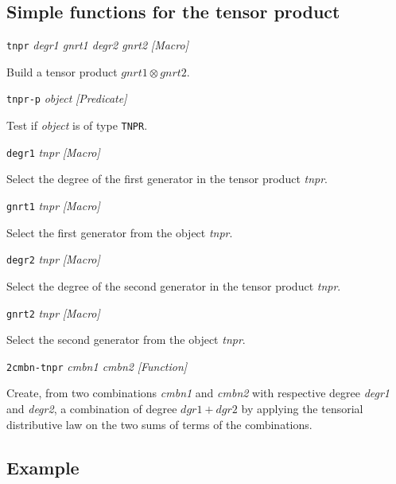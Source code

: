 \subsection {Simple functions for the tensor product}

{\parindent=0mm
{\leftskip=5mm 
{\tt tnpr} {\em degr1 gnrt1 degr2 gnrt2} \hfill {\em [Macro]} \par}
{\leftskip=15mm 
Build a tensor product $gnrt1 \otimes gnrt2$. \par}
{\leftskip=5mm 
{\tt tnpr-p} {\em object} \hfill {\em [Predicate]} \par}
{\leftskip=15mm 
Test if {\em object} is of type {\tt TNPR}. \par}
{\leftskip=5mm 
{\tt degr1} {\em tnpr} \hfill {\em [Macro]} \par}
{\leftskip=15mm 
Select the degree of the first generator in the tensor product {\em tnpr}. \par}
{\leftskip=5mm 
{\tt gnrt1} {\em tnpr} \hfill {\em [Macro]} \par}
{\leftskip=15mm 
Select the first generator from the object {\em tnpr}. \par}
{\leftskip=5mm 
{\tt degr2} {\em tnpr} \hfill {\em [Macro]} \par}
{\leftskip=15mm 
Select the degree of the second generator in the tensor product {\em tnpr}. \par}
{\leftskip=5mm 
{\tt gnrt2} {\em tnpr} \hfill {\em [Macro]} \par}
{\leftskip=15mm 
Select the second generator from the object {\em tnpr}. \par}
{\leftskip=5mm 
{\tt 2cmbn-tnpr} {\em cmbn1 cmbn2} \hfill {\em [Function]} \par}
{\leftskip=15mm 
Create, from two combinations {\em cmbn1} and {\em cmbn2} with respective degree {\em degr1} and {\em degr2}, 
a combination of degree $dgr1 + dgr2$  by applying the tensorial distributive law on the two sums of terms
of the combinations. \par}
}

\subsection* {Example}

